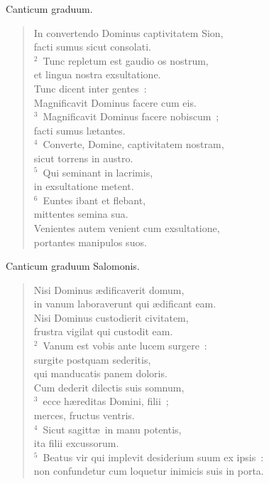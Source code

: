 \bchapter
\lettrine[lines=3,image=true,loversize=0.05,lraise=-0.03]{C}{}anticum graduum. \begin{flushleft}\begin{verse}\vspace{6pt}In convertendo Dominus captivitatem Sion,\\ facti sumus sicut consolati.\\
${}^{2}$~Tunc repletum est gaudio os nostrum,\\ et lingua nostra exsultatione.\\ Tunc dicent inter gentes~:\\ Magnificavit Dominus facere cum eis.\\
${}^{3}$~Magnificavit Dominus facere nobiscum~;\\ facti sumus l\ae tantes.\\
${}^{4}$~Converte, Domine, captivitatem nostram,\\ sicut torrens in austro.\\
${}^{5}$~Qui seminant in lacrimis,\\ in exsultatione metent.\\
${}^{6}$~Euntes ibant et flebant,\\ mittentes semina sua.\\ Venientes autem venient cum exsultatione,\\ portantes manipulos suos.\end{verse}\end{flushleft}



\bchapter
\lettrine[lines=3,image=true,loversize=0.05,lraise=-0.03]{C}{}anticum graduum Salomonis. \begin{flushleft}\begin{verse}\vspace{6pt}Nisi Dominus \ae dificaverit domum,\\ in vanum laboraverunt qui \ae dificant eam.\\ Nisi Dominus custodierit civitatem,\\ frustra vigilat qui custodit eam.\\
${}^{2}$~Vanum est vobis ante lucem surgere~:\\ surgite postquam sederitis,\\ qui manducatis panem doloris.\\ Cum dederit dilectis suis somnum,\\
${}^{3}$~ecce h\ae reditas Domini, filii~;\\ merces, fructus ventris.\\
${}^{4}$~Sicut sagitt\ae\ in manu potentis,\\ ita filii excussorum.\\
${}^{5}$~Beatus vir qui implevit desiderium suum ex ipsis~:\\ non confundetur cum loquetur inimicis suis in porta.\end{verse}\end{flushleft}



